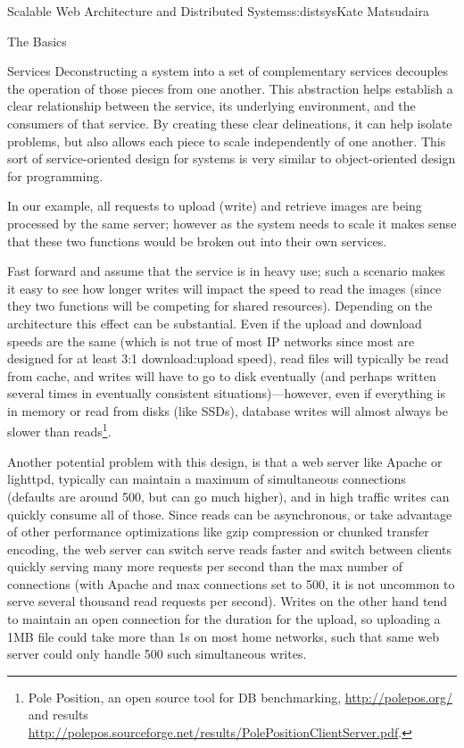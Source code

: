 \begin{aosachapter}{Scalable Web Architecture and Distributed Systems}{s:distsys}{Kate Matsudaira}
\begin{aosasect1}{The Basics}
\begin{aosasect2}{Services}
Deconstructing a system into a set of complementary services decouples
the operation of those pieces from one another. This abstraction helps
establish a clear relationship between the service, its underlying
environment, and the consumers of that service. By creating these
clear delineations, it can help isolate problems, but also allows each
piece to scale independently of one another. This sort of
service-oriented design for systems is very similar to object-oriented
design for programming.

In our example, all requests to upload (write) and retrieve images are
being processed by the same server; however as the system needs to
scale it makes sense that these two functions would be broken out into
their own services.

Fast forward and assume that the service is in heavy use; such a
scenario makes it easy to see how longer writes will impact the speed
to read the images (since they two functions will be competing for
shared resources). Depending on the architecture this effect can be
substantial. Even if the upload and download speeds are the same
(which is not true of most IP networks since most are designed for at
least 3:1 download:upload speed), read files will typically be read
from cache, and writes will have to go to disk eventually (and perhaps
written several times in eventually consistent situations)---however,
even if everything is in memory or read from disks (like SSDs),
database writes will almost always be slower than reads\footnote{Pole
  Position, an open source tool for DB benchmarking,
  \url{http://polepos.org/} and results
  \url{http://polepos.sourceforge.net/results/PolePositionClientServer.pdf}.}.

Another potential problem with this design, is that a web server like
Apache or lighttpd, typically can maintain a maximum of simultaneous
connections (defaults are around 500, but can go much higher), and in
high traffic writes can quickly consume all of those. Since reads can
be asynchronous, or take advantage of other performance optimizations
like gzip compression or chunked transfer encoding, the web server can
switch serve reads faster and switch between clients quickly serving
many more requests per second than the max number of connections (with
Apache and max connections set to 500, it is not uncommon to serve
several thousand read requests per second). Writes on the other hand
tend to maintain an open connection for the duration for the upload,
so uploading a 1MB file could take more than 1s on most home networks,
such that same web server could only handle 500 such simultaneous
writes.


\end{aosasect2}
\end{aosasect1}
\end{aosachapter}
